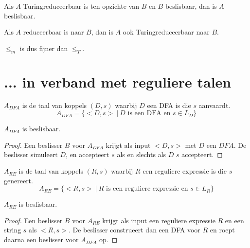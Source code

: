 \documentclass[main.tex]{subfiles}
\begin{document}
\begin{st}
  Als $A$ Turingreduceerbaar is ten opzichte van $B$ en $B$ beslisbaar, dan is $A$ beslisbaar.

\end{st}

\begin{st}
  Als $A$ reduceerbaar is naar $B$, dan is $A$ ook Turingreduceerbaar naar $B$.
\end{st}

\begin{gev}
  $\le_{m}$ is dus fijner dan $\le_{T}$.
\end{gev}

\section{... in verband met reguliere talen}
\label{sec:verb-met-regul}

\begin{de}
  \label{de:a-dfa}
  $A_{DFA}$ is de taal van koppels $(D,s)$ waarbij $D$ een DFA is die $s$ aanvaardt.
  \[ A_{DFA} = \{ <D,s> \ |\ D \text{ is een DFA en } s \in L_{D} \} \]
\end{de}

\begin{st}
  \label{st:a-dfa-besl}
  $A_{DFA}$ is beslisbaar.

  \begin{proof}
    Een beslisser $B$ voor $A_{DFA}$ krijgt als input $<D,s>$ met $D$ een $DFA$.
    De beslisser simuleert $D$, en accepteert $s$ als en slechts als $D$ $s$ accepteert.
  \end{proof}
\end{st}

\begin{de}
  \label{de:a-re}
  $A_{RE}$ is de taal van koppels $(R,s)$ waarbij $R$ een reguliere expressie is die $s$ genereert.
  \[ A_{RE} = \{ <R,s> \ |\ R \text{ is een reguliere expressie en } s \in L_{R} \} \]
\end{de}

\begin{st}
  \label{st:a-re-besl}
  $A_{RE}$ is beslisbaar.

  \begin{proof}
    Een beslisser $B$ voor $A_{RE}$ krijgt als input een reguliere expressie $R$ en een string $s$ als $<R,s>$.
    De beslisser construeert dan een DFA voor $R$ en roept daarna een beslisser voor $A_{DFA}$ op.
  \end{proof}
\end{st}
\end{document}

